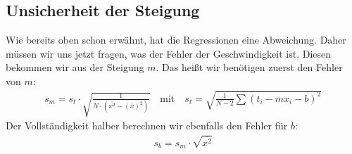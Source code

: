 \documentclass[letterpaper,10pt,english]{jupyterBook}
\begin{document}
\subsection{Unsicherheit der Steigung}
\label{\detokenize{content/T_Fehlerfortpflanzung:unsicherheit-der-steigung}}
\sphinxAtStartPar
Wie bereits oben schon erwähnt, hat die Regressionen eine Abweichung. Daher müssen wir uns jetzt fragen, was der Fehler der Geschwindigkeit ist. Diesen bekommen wir aus der Steigung \(m\). Das heißt wir benötigen zuerst den Fehler von \(m\):
\begin{equation*}
\begin{split}s_m = s_t \cdot \sqrt{\frac{1}{N\cdot (\overline{x^2} - (\overline x)^2)}} \quad \textrm{mit} \quad s_t = \sqrt{\frac{1}{N-2}\sum(t_i - mx_i - b)^2 }\end{split}
\end{equation*}
\sphinxAtStartPar
Der Vollständigkeit halber berechnen wir ebenfalls den Fehler für \(b\):
\begin{equation*}
\begin{split}s_b  = s_m \cdot \sqrt{\overline{x^2}}\end{split}
\end{equation*}
\end{document}
